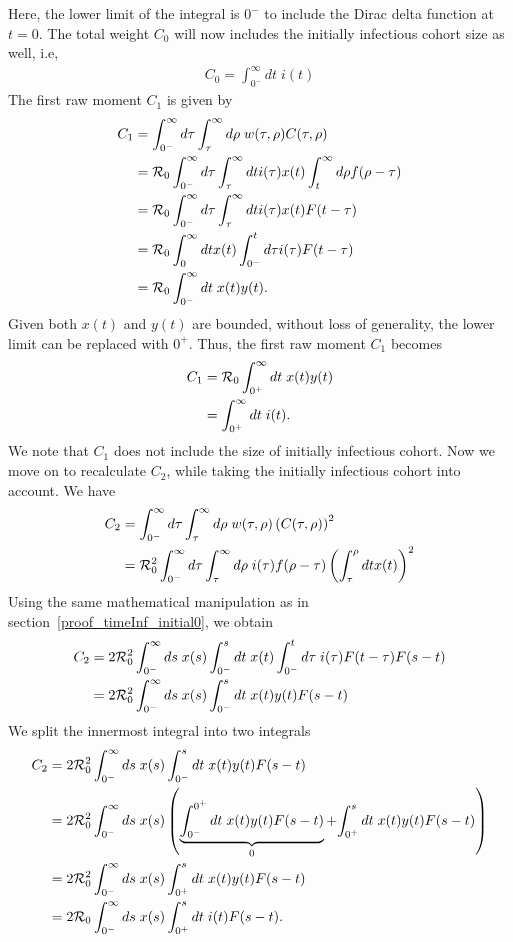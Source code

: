 Here, the lower limit of the integral is $0^-$ to include the Dirac delta function at $t= 0$.
The total weight $C_0$ will now includes the initially infectious cohort size as well, i.e,
\begin{align} \label{eq_C0_y0_notnegligible}
	C_0 = \int_{0^-}^{\infty} dt \; i(t)
\end{align}
The first raw moment $C_1$ is given by
\begin{align*}
	C_1 &= \int_{0^-}^\infty d\tau \int_\tau^\infty d\rho \; w(\tau,\rho) C(\tau,\rho)\\
	& ={\mathcal R}_{\mathrm{0}}\int_{0^-}^\infty d\tau \int_\tau^\infty dt i(\tau) x(t) \int_t^\infty d\rho f(\rho-\tau)\\
		&=  {\mathcal R}_{\mathrm{0}}\int_{0^-}^\infty d\tau \int_\tau^\infty dt i(\tau)x(t) F(t-\tau)\\
	&=  {\mathcal R}_{\mathrm{0}}\int_0^\infty dt x(t) \int_{0^-}^t d\tau i(\tau)F(t-\tau)\\
	 &= {\mathcal R}_{\mathrm{0}}\int_{0^-}^\infty dt\; x(t) y(t).
\end{align*}
Given both $x(t)$ and $y(t)$ are bounded,
without loss of generality, the lower limit can be replaced with $0^+$. Thus,
the first raw moment $C_1$ becomes
\begin{align*}
C_1	&= {\mathcal R}_{\mathrm{0}}\int_{0^+}^\infty dt\; x(t) y(t) \\
&=
\int_{0^+}^\infty dt\; i(t).
\end{align*}
We note that $C_1$ does not include the size of initially infectious cohort. 
Now we move on to recalculate  $C_2$, while taking the initially infectious cohort into account.
We have
\begin{align*}
	C_2 &= \int_{0^-}^\infty d\tau \int_\tau^\infty d\rho \; w(\tau,\rho) \left(C(\tau,\rho)\right)^2\\
	&= {\mathcal R}_{\mathrm{0}}^2 \int_{0^-}^\infty d\tau \int_\tau^\infty d\rho \;i(\tau) f(\rho-\tau) \left(\int_\tau^{\rho} dt x(t)\right)^2 \\
\end{align*}
Using the same mathematical manipulation as in section~\ref{proof_timeInf_initial0}, we obtain
\begin{align*}
	C_2	& = 2{\mathcal R}_{\mathrm{0}}^2 \int_{0^-}^\infty ds\;x(s)\int_{0^-}^s dt \; x(t) \int_{0^-}^t d\tau\;i(\tau)F(t-\tau)F(s-t)\\
	& = 2{\mathcal R}_{\mathrm{0}}^2 \int_{0^-}^\infty ds\;x(s)\int_{0^-}^s dt \; x(t)y(t) F(s-t)
\end{align*}
We split the innermost integral into two integrals
 \begin{align*}
 	C_2 & = 2{\mathcal R}_{\mathrm{0}}^2 \int_{0^-}^\infty ds\;x(s)\int_{0^-}^s dt \; x(t)y(t) F(s-t) \\
 	& = 2{\mathcal R}_{\mathrm{0}}^2 \int_{0^-}^\infty ds\;x(s) \left( \underbrace{\int_{0^-}^{0^+} dt \; x(t)y(t) F(s-t)}_{0} + {\int_{0^+}^s dt \;  x(t) y(t)F(s-t)} \right)\\
 	& = 2{\mathcal R}_{\mathrm{0}}^2 \int_{0^-}^\infty ds\;x(s) \int_{0^+}^s dt\; x(t)y(t) F(s-t) \\
 		& = 2{\mathcal R}_{\mathrm{0}} \int_{0^-}^\infty ds\;x(s) \int_{0^+}^s dt\; i(t)F(s-t).
 \end{align*}
